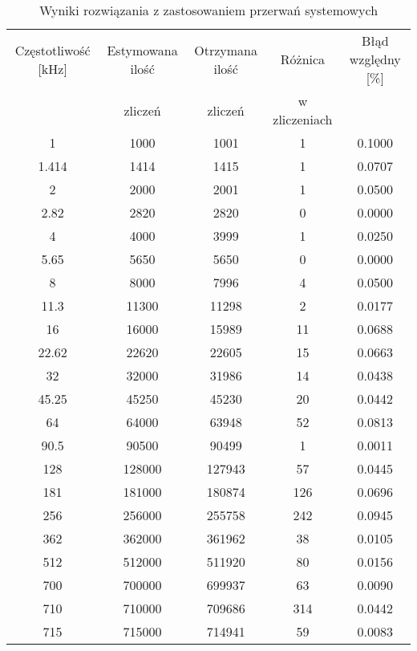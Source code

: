 \begin{table}
        \centering
        \caption{Wyniki rozwiązania z zastosowaniem przerwań systemowych}
        \label{rts table}
        \begin{tabular}{|c|c|c|c|c|}  
                \hline 
                Częstotliwość [kHz] & Estymowana ilość & Otrzymana ilość & Różnica  & Błąd względny [\%]\\ 
                &  zliczeń &  zliczeń & w zliczeniach & \\ \hline
                1 & 1000 & 1001 & 1 & 0.1000\\ \hline 
                1.414 & 1414 & 1415 & 1 & 0.0707\\ \hline 
                2 & 2000 & 2001 & 1 & 0.0500\\ \hline 
                2.82 & 2820 & 2820 & 0 & 0.0000\\ \hline 
                4 & 4000 & 3999 & 1 & 0.0250\\ \hline 
                5.65 & 5650 & 5650 & 0 & 0.0000\\ \hline 
                8 & 8000 & 7996 & 4 & 0.0500\\ \hline 
                11.3 & 11300 & 11298 & 2 & 0.0177\\ \hline 
                16 & 16000 & 15989 & 11 & 0.0688\\ \hline 
                22.62 & 22620 & 22605 & 15 & 0.0663\\ \hline 
                32 & 32000 & 31986 & 14 & 0.0438\\ \hline 
                45.25 & 45250 & 45230 & 20 & 0.0442\\ \hline 
                64 & 64000 & 63948 & 52 & 0.0813\\ \hline 
                90.5 & 90500 & 90499 & 1 & 0.0011\\ \hline 
                128 & 128000 & 127943 & 57 & 0.0445\\ \hline 
                181 & 181000 & 180874 & 126 & 0.0696\\ \hline 
                256 & 256000 & 255758 & 242 & 0.0945\\ \hline 
                362 & 362000 & 361962 & 38 & 0.0105\\ \hline 
                512 & 512000 & 511920 & 80 & 0.0156\\ \hline 
                700 & 700000 & 699937 & 63 & 0.0090\\ \hline 
                710 & 710000 & 709686 & 314 & 0.0442\\ \hline 
                715 & 715000 & 714941 & 59 & 0.0083\\ \hline
        \end{tabular}
\end{table}

